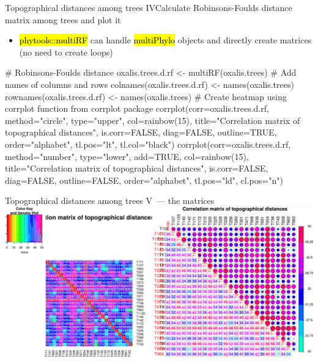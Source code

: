 \documentclass[compress, ucs, xelatex, 11pt, xcolor=svgnames,
	hyperref={
		bookmarks=true,
		unicode=true,
		colorlinks=true,
		pdftitle={Molecular data in R},
		plainpages=false,
		pdfauthor={Vojtech Zeisek},
		pdfsubject={Course about phylogeny and evolution in R},
		pdfcreator={XeLaTeX},
		pdfkeywords={R, evolution, phylogeny, molecular data},
		linkcolor=Tomato,
		anchorcolor=SaddleBrown,
		citecolor=Goldenrod,
		filecolor=DarkMagenta,
		menucolor=Sienna,
		urlcolor=DarkTurquoise,
		pdftex},
	url={hyphens, lowtilde} %
	]{beamer}
\renewcommand{\texttt}[1]{\hl{\ttfamily #1}}
\begin{document}
\begin{frame}[fragile]{Topographical distances among trees IV}{Calculate Robinsons-Foulds distance matrix among trees and plot it}
	\begin{itemize}
		\item \texttt{phytools::multiRF} can handle \texttt{multiPhylo} objects and directly create matrices (no need to create loops)
	\end{itemize}
	\begin{spluscode}
    # Robinsons-Foulds distance
    oxalis.trees.d.rf <- multiRF(oxalis.trees)
    # Add names of columns and rows
    colnames(oxalis.trees.d.rf) <- names(oxalis.trees)
    rownames(oxalis.trees.d.rf) <- names(oxalis.trees)
    # Create heatmap using corrplot function from corrplot package
    corrplot(corr=oxalis.trees.d.rf, method="circle", type="upper",
      col=rainbow(15), title="Correlation matrix of topographical
      distances", is.corr=FALSE, diag=FALSE, outline=TRUE,
      order="alphabet", tl.pos="lt", tl.col="black")
    corrplot(corr=oxalis.trees.d.rf, method="number", type="lower",
      add=TRUE, col=rainbow(15), title="Correlation matrix of
      topographical distances", is.corr=FALSE, diag=FALSE,
      outline=FALSE, order="alphabet", tl.pos="ld", cl.pos="n")
	\end{spluscode}
\end{frame}

\begin{frame}{Topographical distances among trees V~--- the matrices}
	\includegraphics[width=\textwidth]{oxalis-dist.png}
\end{frame}
\end{document}
